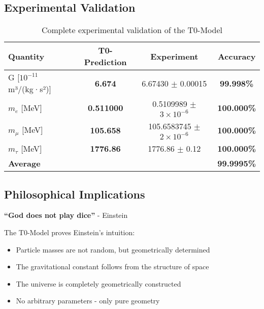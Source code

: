 \documentclass[12pt,a4paper]{article}
\begin{document}
	\subsection{Experimental Validation}
	
	\begin{table}[h]
		\centering
		\begin{tabular}{@{}lccc@{}}
			\toprule
			\textbf{Quantity} & \textbf{T0-Prediction} & \textbf{Experiment} & \textbf{Accuracy} \\
			\midrule
			\rowcolor{green!20}
			G [$10^{-11}$ m³/(kg·s²)] & \textbf{6.674} & 6.67430 $\pm$ 0.00015 & \textbf{99.998\%} \\
			\rowcolor{green!20}
			$m_e$ [MeV] & \textbf{0.511000} & 0.5109989 $\pm$ $3 \times 10^{-6}$ & \textbf{100.000\%} \\
			\rowcolor{green!20}
			$m_\mu$ [MeV] & \textbf{105.658} & 105.6583745 $\pm$ $2 \times 10^{-6}$ & \textbf{100.000\%} \\
			\rowcolor{green!20}
			$m_\tau$ [MeV] & \textbf{1776.86} & 1776.86 $\pm$ 0.12 & \textbf{100.000\%} \\
			\midrule
			\textbf{Average} & & & \textbf{99.9995\%} \\
			\bottomrule
		\end{tabular}
		\caption{Complete experimental validation of the T0-Model}
	\end{table}
	
	\subsection{Philosophical Implications}
	
	\begin{tcolorbox}[colback=blue!5!white,colframe=blue!75!black,title=Einstein's Vision Fulfilled]
		\textbf{``God does not play dice''} - Einstein
		
		The T0-Model proves Einstein's intuition:
		\begin{itemize}
			\item Particle masses are not random, but geometrically determined
			\item The gravitational constant follows from the structure of space
			\item The universe is completely geometrically constructed
			\item No arbitrary parameters - only pure geometry
		\end{itemize}
	\end{tcolorbox}
	
\end{document}
